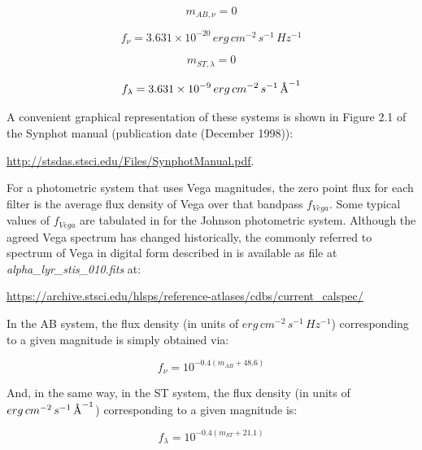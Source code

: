 \documentclass[11pt,a4paper]{ivoa}
\newcommand{\angstrom}{\mbox{\normalfont\AA}}
\begin{document}
\begin{equation} \label{eq:7_0}
m_{AB,\nu } = 0
\end{equation}

\begin{equation} \label{eq:8}
f_\nu = 3.631 \times 10^{-20}\,erg\,cm^{-2}\,s^{-1}\,Hz^{-1}
\end{equation}

\begin{equation} \label{eq:9}
m_{ST,\lambda } = 0
\end{equation}

\begin{equation} \label{eq:10}
f_\lambda = 3.631 \times 10^{-9}\,erg\,cm^{-2}\,s^{-1}\,\angstrom^{-1}
\end{equation}


A convenient graphical representation of these systems is shown in
Figure 2.1 of the Synphot manual (publication date (December 1998)):

\url{http://stsdas.stsci.edu/Files/SynphotManual.pdf}.
\par

For a photometric system that uses Vega magnitudes, the zero point
flux for each filter is the average flux density of Vega over that
bandpass $f_{Vega}$. Some typical values of $f_{Vega}$ are tabulated in
\citep{2001eaa..book.....M} for the Johnson photometric system. Although
the agreed Vega spectrum has changed historically, the commonly referred to
spectrum of Vega in digital form described in \citep{2004AJ....127.3508B}
is available as file at \emph{alpha\_lyr\_stis\_010.fits} at:\par
\url{https://archive.stsci.edu/hlsps/reference-atlases/cdbs/current_calspec/}
\par

In the AB system, the flux density (in units of $erg\, cm^{-2}\, s^{-1}\, Hz^{-1}$)
corresponding to a given magnitude is simply obtained via:

\begin{equation} \label{eq:11}
f_{\nu} = 10^{-0.4(m_{AB}+48.6)}
\end{equation}

And, in the same way, in the ST system, the flux density (in units of $erg\,
cm^{-2}\, s^{-1}\, \angstrom^{-1}$) corresponding to a given magnitude is:

\begin{equation} \label{eq:12}
f_{\lambda} = 10^{-0.4(m_{ST}+21.1)}
\end{equation}
\end{document}

